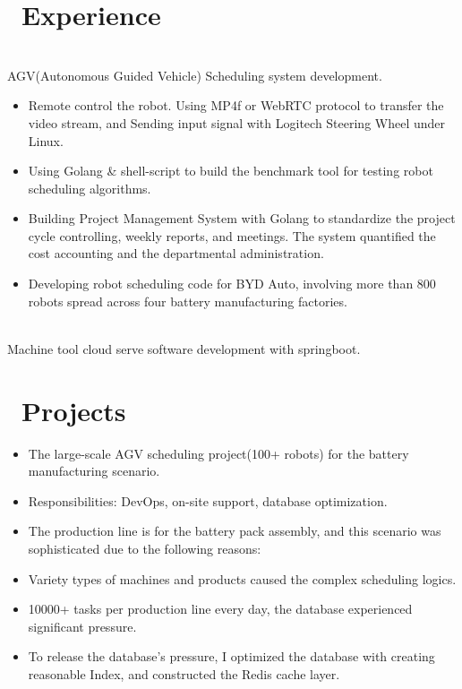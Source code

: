 \documentclass[a4paper,10pt]{resume}
\begin{document}
\section{\faUsers\ Experience}
\\AGV(Autonomous Guided Vehicle) Scheduling system development.
\begin{itemize}
  \item Remote control the robot. Using MP4f or WebRTC protocol to transfer the video stream, and Sending input signal with Logitech Steering Wheel under Linux.
  \item Using Golang \& shell-script to build the benchmark tool for testing robot scheduling algorithms.
  \item Building Project Management System with Golang to standardize the project cycle controlling, weekly reports, and meetings. The system quantified the cost accounting and the departmental administration.
  \item Developing robot scheduling code for BYD Auto, involving more than 800 robots spread across four battery manufacturing factories.
\end{itemize}

\\ Machine tool cloud serve software development with springboot.

\section{\faFile\ Projects}
\begin{itemize}[parsep=0.5ex]
  \item The large-scale AGV scheduling project(100+ robots) for the battery manufacturing scenario.
  \item Responsibilities: DevOps, on-site support, database optimization.
  \item The production line is for the battery pack assembly, and this scenario was sophisticated due to the following reasons:
  \item Variety types of machines and products caused the complex scheduling logics.
  \item 10000+ tasks per production line every day, the database experienced significant pressure.
  \item To release the database's pressure, I optimized the database with creating reasonable Index, and constructed the Redis cache layer.
\end{itemize}
\end{document}
